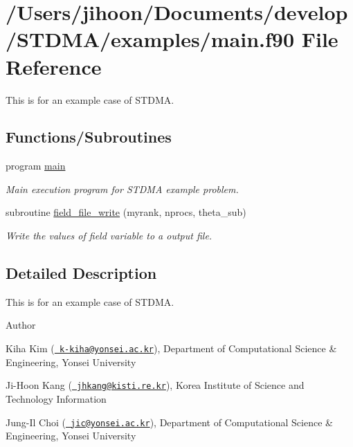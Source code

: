 \hypertarget{main_8f90}{}\section{/\+Users/jihoon/\+Documents/develop/\+S\+T\+D\+M\+A/examples/main.f90 File Reference}
\label{main_8f90}


This is for an example case of S\+T\+D\+MA.  


\subsection*{Functions/\+Subroutines}
\begin{DoxyCompactItemize}
\item 
program \mbox{\hyperlink{main_8f90_a8ec2266d83cd6c0b762cbcbc92c0af3d}{main}}
\begin{DoxyCompactList}\small\item\em Main execution program for S\+T\+D\+MA example problem. \end{DoxyCompactList}\item 
subroutine \mbox{\hyperlink{main_8f90_af0a1310807f21ee1a2c0fdf14c58b63b}{field\+\_\+file\+\_\+write}} (myrank, nprocs, theta\+\_\+sub)
\begin{DoxyCompactList}\small\item\em Write the values of field variable to a output file. \end{DoxyCompactList}\end{DoxyCompactItemize}


\subsection{Detailed Description}
This is for an example case of S\+T\+D\+MA. 

\begin{DoxyAuthor}{Author}

\end{DoxyAuthor}

\begin{DoxyItemize}
\item Kiha Kim (\href{mailto:k-kiha@yonsei.ac.kr}{\texttt{ k-\/kiha@yonsei.\+ac.\+kr}}), Department of Computational Science \& Engineering, Yonsei University
\item Ji-\/\+Hoon Kang (\href{mailto:jhkang@kisti.re.kr}{\texttt{ jhkang@kisti.\+re.\+kr}}), Korea Institute of Science and Technology Information
\item Jung-\/\+Il Choi (\href{mailto:jic@yonsei.ac.kr}{\texttt{ jic@yonsei.\+ac.\+kr}}), Department of Computational Science \& Engineering, Yonsei University
\end{DoxyItemize}


